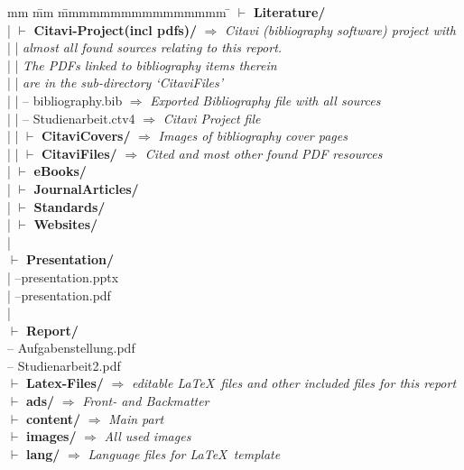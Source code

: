 \begin{tabbing}
	mm \= mm \= mmmmmmmmmmmmmmmm \= \kill
	$\vdash$ \textbf{Literature/} \\ 
	| \> $\vdash$ \textbf{Citavi-Project(incl pdfs)/} \> \> $\Rightarrow$ \textit{Citavi (bibliography software) project with}\\
	| \> | \> \> \textit{almost all found sources relating to this report.} \\
	| \> | \> \> \textit{The PDFs linked to bibliography items therein} \\
	| \> | \> \> \textit{are in the sub-directory `CitaviFiles'}\\
	| \> | \>  -- bibliography.bib  \> $\Rightarrow$ \textit{Exported Bibliography file with all sources}\\
	| \> | \>  --	Studienarbeit.ctv4  \>  $\Rightarrow$ \textit{Citavi Project file}\\
	| \> | \>  $\vdash$ \textbf{CitaviCovers/} \>  $\Rightarrow$ \textit{Images of bibliography cover pages}\\
	| \> | \>  $\vdash$ \textbf{CitaviFiles/} \> $\Rightarrow$ \textit{Cited and most other found PDF resources}\\ %
	| \> $\vdash$ \textbf{eBooks/} \\
	| \> $\vdash$ \textbf{JournalArticles/} \\
	| \> $\vdash$ \textbf{Standards/}\\
	| \> $\vdash$ \textbf{Websites/} \\ %
	|\\
	$\vdash$ \textbf{Presentation/} \\
	| \>  --presentation.pptx\\
	| \>  --presentation.pdf\\
	|\\
	$\vdash$ \textbf{Report/} \\ %
	\>  -- Aufgabenstellung.pdf\\
	\>  -- Studienarbeit2.pdf\\
	\>  $\vdash$ \textbf{Latex-Files/}   $\Rightarrow$ \textit{editable \LaTeX~files and other included files for this report}\\ %
	\> \>  $\vdash$  \textbf{ads/}   	\> $\Rightarrow$ \textit{Front- and Backmatter}\\
	\> \>  $\vdash$  \textbf{content/}  \> $\Rightarrow$ \textit{Main part}\\
	\> \>  $\vdash$  \textbf{images/}   \> $\Rightarrow$ \textit{All used images}\\
	\> \>  $\vdash$  \textbf{lang/}  \> $\Rightarrow$ \textit{Language files for \LaTeX~template}\\ %
\end{tabbing}
